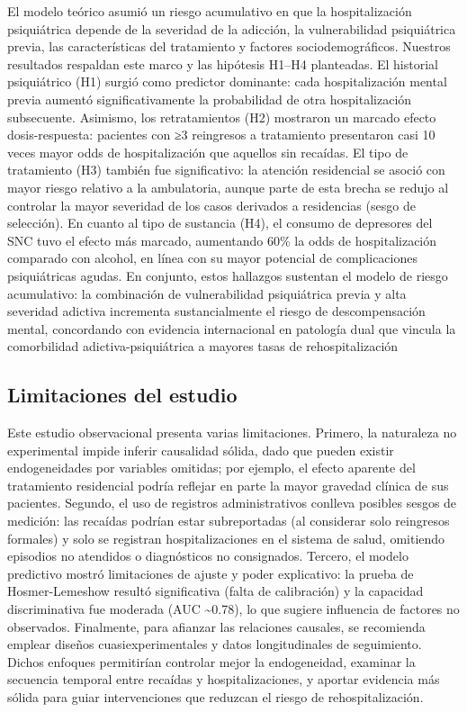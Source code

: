\documentclass[
  spanish,
  10pt,
]{article}
\begin{document}
El modelo teórico asumió un riesgo acumulativo en que la hospitalización
psiquiátrica depende de la severidad de la adicción, la vulnerabilidad
psiquiátrica previa, las características del tratamiento y factores
sociodemográficos. Nuestros resultados respaldan este marco y las
hipótesis H1--H4 planteadas. El historial psiquiátrico (H1) surgió como
predictor dominante: cada hospitalización mental previa aumentó
significativamente la probabilidad de otra hospitalización subsecuente.
Asimismo, los retratamientos (H2) mostraron un marcado efecto
dosis-respuesta: pacientes con ≥3 reingresos a tratamiento presentaron
casi 10 veces mayor odds de hospitalización que aquellos sin recaídas.
El tipo de tratamiento (H3) también fue significativo: la atención
residencial se asoció con mayor riesgo relativo a la ambulatoria, aunque
parte de esta brecha se redujo al controlar la mayor severidad de los
casos derivados a residencias (sesgo de selección). En cuanto al tipo de
sustancia (H4), el consumo de depresores del SNC tuvo el efecto más
marcado, aumentando 60\% la odds de hospitalización comparado con
alcohol, en línea con su mayor potencial de complicaciones psiquiátricas
agudas. En conjunto, estos hallazgos sustentan el modelo de riesgo
acumulativo: la combinación de vulnerabilidad psiquiátrica previa y alta
severidad adictiva incrementa sustancialmente el riesgo de
descompensación mental, concordando con evidencia internacional en
patología dual que vincula la comorbilidad adictiva-psiquiátrica a
mayores tasas de rehospitalización

\subsection{Limitaciones del estudio}\label{limitaciones-del-estudio}

Este estudio observacional presenta varias limitaciones. Primero, la
naturaleza no experimental impide inferir causalidad sólida, dado que
pueden existir endogeneidades por variables omitidas; por ejemplo, el
efecto aparente del tratamiento residencial podría reflejar en parte la
mayor gravedad clínica de sus pacientes. Segundo, el uso de registros
administrativos conlleva posibles sesgos de medición: las recaídas
podrían estar subreportadas (al considerar solo reingresos formales) y
solo se registran hospitalizaciones en el sistema de salud, omitiendo
episodios no atendidos o diagnósticos no consignados. Tercero, el modelo
predictivo mostró limitaciones de ajuste y poder explicativo: la prueba
de Hosmer-Lemeshow resultó significativa (falta de calibración) y la
capacidad discriminativa fue moderada (AUC \textasciitilde0.78), lo que
sugiere influencia de factores no observados. Finalmente, para afianzar
las relaciones causales, se recomienda emplear diseños
cuasiexperimentales y datos longitudinales de seguimiento. Dichos
enfoques permitirían controlar mejor la endogeneidad, examinar la
secuencia temporal entre recaídas y hospitalizaciones, y aportar
evidencia más sólida para guiar intervenciones que reduzcan el riesgo de
rehospitalización.
\end{document}
